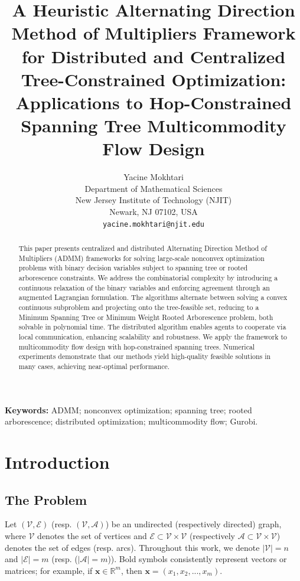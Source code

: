 \documentclass[11pt,a4paper]{article}
\title{A Heuristic Alternating Direction Method of Multipliers Framework for Distributed and Centralized Tree-Constrained Optimization:\\
	Applications to Hop-Constrained Spanning Tree Multicommodity Flow Design}
\author{
	Yacine Mokhtari\\
	Department of Mathematical Sciences\\
	New Jersey Institute of Technology (NJIT)\\
	Newark, NJ 07102, USA\\
	\texttt{yacine.mokhtari@njit.edu}
}
\date{}  %
\theoremstyle{plain}
\theoremstyle{definition}
\theoremstyle{remark}
\begin{document}
	
	\maketitle
	
	\begin{abstract}
		This paper presents centralized and distributed Alternating Direction Method of Multipliers (ADMM) frameworks for solving large-scale nonconvex optimization problems with binary decision variables subject to spanning tree or rooted arborescence constraints. We address the combinatorial complexity by introducing a continuous relaxation of the binary variables and enforcing agreement through an augmented Lagrangian formulation. The algorithms alternate between solving a convex continuous subproblem and projecting onto the tree-feasible set, reducing to a Minimum Spanning Tree or Minimum Weight Rooted Arborescence problem, both solvable in polynomial time. The distributed algorithm enables agents to cooperate via local communication, enhancing scalability and robustness. We apply the framework to multicommodity flow design with hop-constrained spanning trees. Numerical experiments demonstrate that our methods yield high-quality feasible solutions in many cases, achieving near-optimal performance.
	\end{abstract}
	
	\noindent\textbf{Keywords:} ADMM; nonconvex optimization; spanning tree; rooted arborescence; distributed optimization; multicommodity flow; Gurobi.

	\section{Introduction}
	
	\subsection{The Problem}
	Let $(\mathcal{V}, \mathcal{E})$ (resp. $(\mathcal{V}, \mathcal{A})$) be an undirected (respectively directed) graph, where $\mathcal{V}$ denotes the set of vertices and $\mathcal{E} \subset \mathcal{V} \times \mathcal{V}$ (respectively $\mathcal{A} \subset \mathcal{V} \times \mathcal{V}$) denotes the set of edges (resp. arcs). Throughout this work, we denote $|\mathcal{V}| = n$ and $|\mathcal{E}| =m$ (resp. ($|\mathcal{A}| = m$)). Bold symbols consistently represent vectors or matrices; for example, if \(\boldsymbol{x} \in \mathbb{R}^m\), then $\boldsymbol{x} = (x_1,x_2,...,x_m)$.
	
\end{document}
